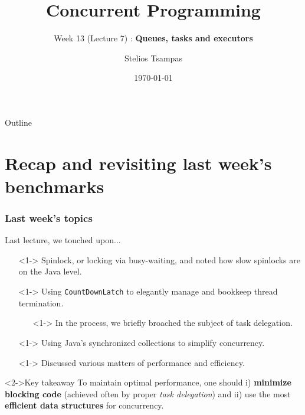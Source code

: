 \documentclass[xcolor={dvipsnames,svgnames},aspectratio=169]{beamer}
\title{Concurrent Programming}
\subtitle{Week 13 (Lecture 7) : \textbf{Queues, tasks and executors}}
\author{Stelios Tsampas}
\institute{
  \faEnvelope \; stelios@imada.sdu.dk
  \qquad
  \faGlobe \;
  \href{https://www.steliostsampas.com}{https://www.steliostsampas.com}
  \\\\\
  \faGithub \; stelios-tau/cp-2025
}
\date{\today}
\begin{document}
\frame{\titlepage}

\def\firstcircle{(0,0) circle (2cm)}
\def\secondcircle{(1.4,1.4) circle (2cm)}
\def\thirdcircle{(0:2.4) circle (2cm)}

\begin{frame}{Outline}
  \tableofcontents
\end{frame}

\section{Recap and revisiting last week's benchmarks}

\begin{frame}[fragile]
  \frametitle{Last week's topics}

  Last lecture, we touched upon...

  \begin{itemize}
  \item[\faBook]<1-> Spinlock, or locking via busy-waiting, and noted how slow
    spinlocks are on the Java level.
  \item[\faBook]<1-> Using \texttt{CountDownLatch} to elegantly manage and
    bookkeep thread termination.
    \begin{itemize}
    \item[\faBook]<1-> In the process, we briefly broached the subject of task
      delegation.
    \end{itemize}
  \item[\faBook]<1-> Using Java's synchronized collections to simplify
    concurrency.
  \item[\faBook]<1-> Discussed various matters of performance and efficiency.
  \end{itemize}

  \vspace{0.4cm}

  \begin{block}<2->{\faLightbulb \quad Key takeaway}
    To maintain optimal performance, one should i) \textbf{minimize blocking code}
    (achieved often by proper \emph{task delegation}) and ii) use the most
    \textbf{efficient data structures} for concurrency.
  \end{block}
\end{frame}
\end{document}

